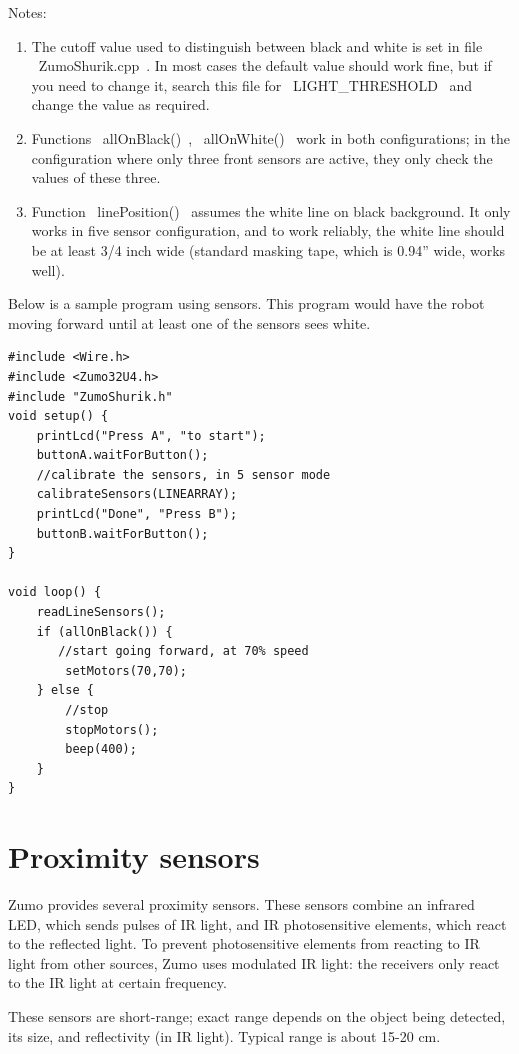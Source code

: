 \documentclass[oneside]{stml-l}
\numberwithin{figure}{chapter}
\begin{document}
Notes: 
\begin{enumerate}
\item The cutoff value used to distinguish between black and white 
is set in file ~ZumoShurik.cpp~. In most cases the default value 
should work fine, but if you need to change it, search this file 
for ~LIGHT_THRESHOLD~ and change the value as required. 

\item Functions ~allOnBlack()~, ~allOnWhite()~ work in both configurations; 
in the configuration where only three front sensors are active, they 
only check the values of these three. 

\item Function ~linePosition()~ assumes the white line on 
black background. It only works in five sensor configuration, and 
to work reliably, the white line should be at least 3/4 inch wide 
(standard masking tape, which is 0.94'' wide, works well). 

\end{enumerate}
 
 Below is a sample program using sensors. This program would have 
 the robot moving forward until at least one of the sensors sees white. 
 
 
 \begin{lstlisting}
#include <Wire.h>
#include <Zumo32U4.h>
#include "ZumoShurik.h"
void setup() {
    printLcd("Press A", "to start");
    buttonA.waitForButton();
    //calibrate the sensors, in 5 sensor mode
    calibrateSensors(LINEARRAY);
    printLcd("Done", "Press B");
    buttonB.waitForButton();
}

void loop() {
    readLineSensors();
    if (allOnBlack()) {
       //start going forward, at 70% speed
        setMotors(70,70);
    } else {
        //stop
        stopMotors();
        beep(400);
    }   
}
\end{lstlisting}
 
 
\section{Proximity sensors}
Zumo provides several proximity sensors. These sensors combine an 
infrared LED, which sends pulses of IR light, and IR photosensitive elements, 
which react to the reflected light. To prevent photosensitive elements 
from reacting to IR light from other sources, Zumo uses modulated 
IR light: the receivers only react to the IR light at certain frequency. 

These sensors are short-range; exact range depends on the object 
being detected, its size,  and reflectivity (in IR light). Typical range 
is about 15-20 cm. 
\end{document}
